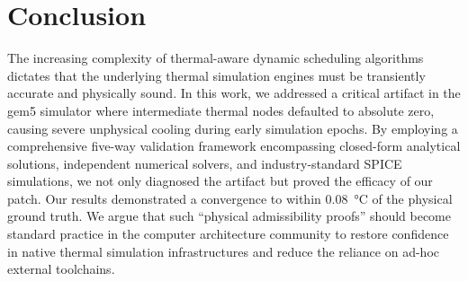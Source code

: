 \section{Conclusion}
\label{sec:conclusion}

The increasing complexity of thermal-aware dynamic scheduling algorithms dictates that the underlying thermal simulation engines must be transiently accurate and physically sound. In this work, we addressed a critical artifact in the gem5 simulator where intermediate thermal nodes defaulted to absolute zero, causing severe unphysical cooling during early simulation epochs. By employing a comprehensive five-way validation framework encompassing closed-form analytical solutions, independent numerical solvers, and industry-standard SPICE simulations, we not only diagnosed the artifact but proved the efficacy of our patch. Our results demonstrated a convergence to within \SI{0.08}{\degreeCelsius} of the physical ground truth. We argue that such ``physical admissibility proofs'' should become standard practice in the computer architecture community to restore confidence in native thermal simulation infrastructures and reduce the reliance on ad-hoc external toolchains.
